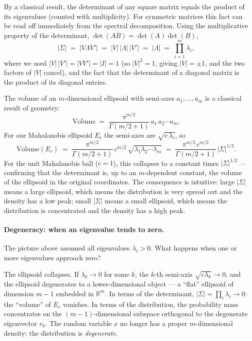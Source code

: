 \documentclass[11pt, a4paper, oneside]{article}
\begin{document}
By a classical result, the determinant of any square matrix equals
the product of its eigenvalues (counted with multiplicity). For
symmetric matrices this fact can be read off immediately from the
spectral decomposition. Using the multiplicative property of the
determinant, $\det(AB) = \det(A)\det(B)$,
\[
|\Sigma| \;=\; |V \Lambda V'| \;=\; |V|\,|\Lambda|\,|V'| \;=\; |\Lambda| \;=\; \prod_{i=1}^{m} \lambda_i,
\]
where we used $|V|\,|V'| = |V V'| = |I| = 1$ (so $|V|^2 = 1$, giving
$|V| = \pm 1$, and the two factors of $|V|$ cancel), and the fact
that the determinant of a diagonal matrix is the product of its
diagonal entries.

The volume of an $m$-dimensional ellipsoid with semi-axes
$a_1, \ldots, a_m$ is a classical result of geometry:
\[
\mathrm{Volume} \;=\; \frac{\pi^{m/2}}{\Gamma(m/2 + 1)}\, a_1\, a_2 \cdots a_m.
\]
For our Mahalanobis ellipsoid $E_c$ the semi-axes are
$\sqrt{c\, \lambda_i}$, so
\[
\mathrm{Volume}(E_c) \;=\; \frac{\pi^{m/2}}{\Gamma(m/2 + 1)}\, c^{m/2}\, \sqrt{\lambda_1 \lambda_2 \cdots \lambda_m}
\;=\; \frac{\pi^{m/2}\, c^{m/2}}{\Gamma(m/2 + 1)}\, |\Sigma|^{1/2}.
\]
For the unit Mahalanobis ball ($c = 1$), this collapses to a constant
times $|\Sigma|^{1/2}$ — confirming that the determinant is, up to an
$m$-dependent constant, the volume of the ellipsoid in the original
coordinates. The consequence is intuitive: large $|\Sigma|$ means a
large ellipsoid, which means the distribution is very spread out and
the density has a low peak; small $|\Sigma|$ means a small ellipsoid,
which means the distribution is concentrated and the density has a
high peak.

\paragraph{Degeneracy: when an eigenvalue tends to zero.}
The picture above assumed all eigenvalues $\lambda_i > 0$. What happens
when one or more eigenvalues approach zero?

The ellipsoid collapses. If $\lambda_k \to 0$ for some $k$, the $k$-th
semi-axis $\sqrt{c \lambda_k} \to 0$, and the ellipsoid degenerates to
a lower-dimensional object — a ``flat'' ellipsoid of dimension $m-1$
embedded in $\mathbb{R}^m$. In terms of the determinant,
$|\Sigma| = \prod_i \lambda_i \to 0$: the ``volume'' of $E_c$ vanishes.
In terms of the distribution, the probability mass concentrates on the
$(m-1)$-dimensional subspace orthogonal to the degenerate eigenvector
$v_k$. The random variable $x$ no longer has a proper $m$-dimensional
density: the distribution is \emph{degenerate}.
\end{document}
